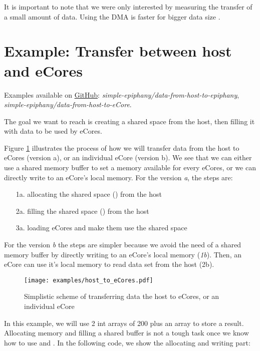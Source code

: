 It is important to note that we were only interested by measuring the transfer of a small amount of data. Using the \gls{DMA} is faster for bigger data size \cite{programmingadapteva}.


\section[Example 3]{Example: Transfer between host and eCores} \label{ex3}

Examples available on \href{https://github.com/nkcr/parallella-computing/tree/master/simple-epiphany/data-from-host-to-epiphany}{GitHub}\cite{githubproject}: \textit{simple-epiphany/data-from-host-to-epiphany}, \textit{simple-epiphany/data-from-host-to-eCore}.

The goal we want to reach is creating a shared space from the host, then filling it with data to be used by \glspl{eCore}.

Figure \ref{fig host to eCore} illustrates the process of how we will transfer data from the host to \glspl{eCore} (version a), or an individual \gls{eCore} (version b). We see that we can either use a shared memory buffer to set a memory available for every \glspl{eCore}, or we can directly write to an \gls{eCore}'s local memory. For the version \textit{a}, the steps are:

\begin{enumerate}
  \item[1a.] allocating the shared space () from the host
  \item[2a.] filling the shared space () from the host
  \item[3a.] loading \glspl{eCore} and make them use the shared space
\end{enumerate}

For the version \textit{b} the steps are simpler because we avoid the need of a shared memory buffer by directly writing to an \gls{eCore}'s local memory (\textit{1b}). Then, an \gls{eCore} can use it's local memory to read data set from the host (2b).

\begin{figure}[h!]
\centering
\texttt{[image: examples/host\_to\_eCores.pdf]}
\caption{Simplistic scheme of transferring data the host to \glspl{eCore}, or an individual \gls{eCore}}
\label{fig host to eCore}
\end{figure}

In this example, we will use 2 int arrays of 200 plus an array to store a result. Allocating memory and filling a shared buffer is not a tough task once we know how to use  and . In the following code, we show the allocating and writing part:

